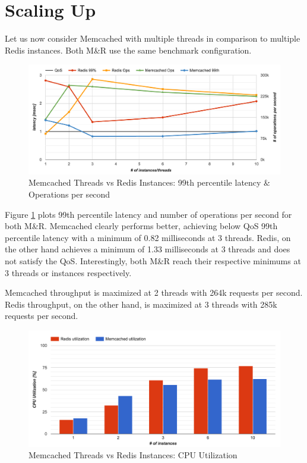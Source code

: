 \section{Scaling Up}
Let us now consider Memcached with multiple threads in comparison to multiple Redis instances. Both M\&R use the same benchmark configuration.

\begin{figure}[h]
    \includegraphics[width=\textwidth]{./res2/mr_instances.png}
    \caption{Memcached Threads vs Redis Instances: 99th percentile latency \& Operations per second}
    \label{fig:mr_instances}
\end{figure}

Figure \ref{fig:mr_instances} plots 99th percentile latency and number of operations per second for both M\&R. Memcached clearly performs better, achieving below QoS 99th percentile latency with a minimum of 0.82 milliseconds at 3 threads. Redis, on the other hand achieves a minimum of 1.33 milliseconds at 3 threads and does not satisfy the QoS. Interestingly, both M\&R reach their respective minimums at 3 threads or instances respectively.

Memcached throughput is maximized at 2 threads with 264k requests per second. Redis throughput, on the other hand, is maximized at 3 threads with 285k requests per second.

\begin{figure}[h]
    \includegraphics[width=\textwidth]{./res2/mr_instances_cpu.png}
    \caption{Memcached Threads vs Redis Instances: CPU Utilization}
    \label{fig:mr_instances_cpu}
\end{figure}


